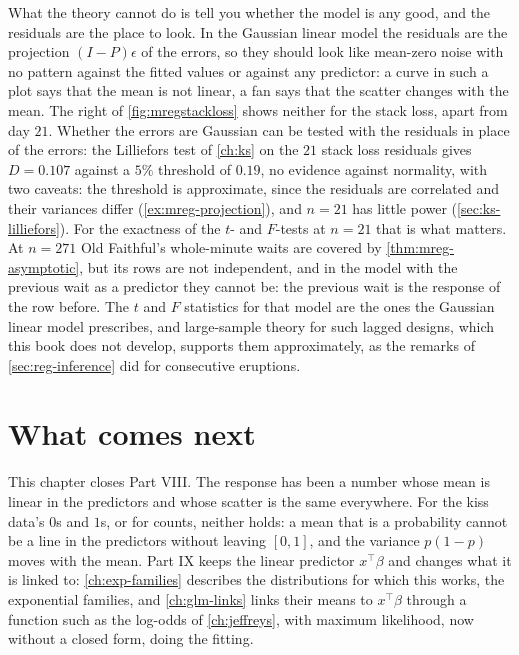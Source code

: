 What the theory cannot do is tell you whether the model is any good, and the residuals are the place to look.
In the Gaussian linear model the residuals are the projection $(I - P)\epsilon$ of the errors, so they should look like mean-zero noise with no pattern against the fitted values or against any predictor: a curve in such a plot says that the mean is not linear, a fan says that the scatter changes with the mean.
The right of \cref{fig:mregstackloss} shows neither for the stack loss, apart from day $21$.
Whether the errors are Gaussian can be tested with the residuals in place of the errors: the Lilliefors test of \cref{ch:ks} on the $21$ stack loss residuals gives $D = 0.107$ against a $5\%$ threshold of $0.19$, no evidence against normality, with two caveats: the threshold is approximate, since the residuals are correlated and their variances differ (\cref{ex:mreg-projection}), and $n = 21$ has little power (\cref{sec:ks-lilliefors}).
For the exactness of the $t$- and $F$-tests at $n = 21$ that is what matters. At $n = 271$ Old Faithful's whole-minute waits are covered by \cref{thm:mreg-asymptotic}, but its rows are not independent, and in the model with the previous wait as a predictor they cannot be: the previous wait is the response of the row before. The $t$ and $F$ statistics for that model are the ones the Gaussian linear model prescribes, and large-sample theory for such lagged designs, which this book does not develop, supports them approximately, as the remarks of \cref{sec:reg-inference} did for consecutive eruptions.

\section{What comes next}
\label{sec:mreg-next}

This chapter closes Part VIII.
The response has been a number whose mean is linear in the predictors and whose scatter is the same everywhere.
For the kiss data's $0$s and $1$s, or for counts, neither holds: a mean that is a probability cannot be a line in the predictors without leaving $[0, 1]$, and the variance $p(1 - p)$ moves with the mean.
Part IX keeps the linear predictor $x^\top\beta$ and changes what it is linked to: \cref{ch:exp-families} describes the distributions for which this works, the exponential families, and \cref{ch:glm-links} links their means to $x^\top\beta$ through a function such as the log-odds of \cref{ch:jeffreys}, with maximum likelihood, now without a closed form, doing the fitting.

